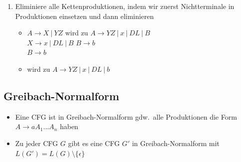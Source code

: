 \documentclass[ieeetran]{article}
\begin{document}
\begin{itemize}
\begin{enumerate}
\item Eliminiere alle Kettenproduktionen, indem wir zuerst Nichtterminale in Produktionen einsetzen und dann eliminieren
	\begin{itemize}
		\item $A \rightarrow X \ | \ YZ$ \hspace*{0.5cm} wird zu \hspace*{0.5cm} $A \rightarrow YZ \ | \ x \ | \ DL \ | \ B$
		  \\ $X \rightarrow x \ | \ DL \ | \ B$ \hspace*{1.8cm} $B \rightarrow b$
\\ $B \rightarrow b$
\item wird zu $A \rightarrow YZ \ | \ x \ | \ DL \ | \ b$
	\end{itemize}
	\end{enumerate}


\end{itemize}

\subsection{Greibach-Normalform} %
\label{sub:greibach_normalform}
\begin{itemize}
	\item Eine CFG ist in Greibach-Normalform gdw.\ alle Produktionen die Form $A \rightarrow aA_1 \ldots A_n$ haben
	\item Zu jeder CFG $G$ gibt es eine CFG $G'$ in Greibach-Normalform mit $L(G') = L(G) \setminus \{\epsilon\}$
\end{itemize}
\end{document}
